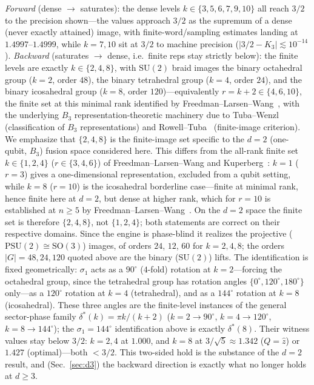 \documentclass[aps,prx,reprint,amsmath,amssymb,floatfix,nofootinbib,superscriptaddress]{revtex4-2}
\begin{document}
\noindent\emph{Forward} (dense $\to$ saturates): the dense levels
$k \in \{3,5,6,7,9,10\}$ all reach $3/2$ to the precision shown---the values approach
$3/2$ as the supremum of a dense (never exactly attained) image, with
finite-word/sampling estimates landing at $1.4997$--$1.4999$, while $k = 7, 10$ sit at
$3/2$ to machine precision ($|3/2 - K_3| \lesssim 10^{-14}$).
\emph{Backward} (saturates $\to$ dense, i.e.\ finite reps stay strictly below): the
finite levels are exactly $k \in \{2,4,8\}$, with $\mathrm{SU}(2)$ braid images the
binary octahedral group ($k=2$, order $48$), the binary tetrahedral group ($k=4$,
order $24$), and the binary icosahedral group ($k=8$, order $120$)---equivalently
$r = k+2 \in \{4,6,10\}$, the finite set at this minimal rank identified by
Freedman--Larsen--Wang~\cite{FLW}, with the underlying $B_3$
representation-theoretic machinery due to Tuba--Wenzl~\cite{TW} (classification of
$B_3$ representations) and Rowell--Tuba~\cite{RT} (finite-image criterion). We
emphasize that $\{2,4,8\}$
is the finite-image set specific to the $d=2$ (one-qubit, $B_3$) fusion space
considered here. This differs from the all-rank finite set $k \in \{1,2,4\}$
($r \in \{3,4,6\}$) of Freedman--Larsen--Wang and Kuperberg~\cite{FLW,Kup}: $k=1$
($r=3$) gives a one-dimensional representation, excluded from a qubit setting,
while $k=8$ ($r=10$) is the icosahedral borderline case---finite at minimal rank,
hence finite here at $d=2$, but dense at higher rank, which for $r=10$ is
established at $n \ge 5$ by Freedman--Larsen--Wang~\cite{FLW}. On the $d=2$ space
the finite set is therefore
$\{2,4,8\}$, not $\{1,2,4\}$; both statements are correct on their respective
domains. Since the engine is phase-blind it realizes the projective
($\mathrm{PSU}(2)\cong\mathrm{SO}(3)$) images, of orders $24$, $12$, $60$ for
$k=2,4,8$; the orders $|G|=48,24,120$ quoted above are the binary
($\mathrm{SU}(2)$) lifts. The identification is fixed geometrically: $\sigma_1$
acts as a $90^\circ$ ($4$-fold) rotation at $k=2$---forcing the octahedral group,
since the tetrahedral group has rotation angles $\{0^\circ,120^\circ,180^\circ\}$
only---as a $120^\circ$ rotation at $k=4$ (tetrahedral), and as a $144^\circ$
rotation at $k=8$ (icosahedral). These three angles are the finite-level instances
of the general sector-phase family $\delta^\ast(k) = \pi k/(k+2)$
($k=2\to90^\circ$, $k=4\to120^\circ$, $k=8\to144^\circ$); the $\sigma_1=144^\circ$
identification above is exactly $\delta^\ast(8)$. Their witness values stay below $3/2$: $k=2,4$ at $1.000$, and $k=8$ at
$3/\sqrt5 \approx 1.342$ ($Q=\hat z$) or $1.427$ (optimal)---both $< 3/2$. This
two-sided hold is the substance of the $d=2$ result, and (Sec.~\ref{sec:d3}) the
backward direction is exactly what no longer holds at $d \ge 3$.
\end{document}
